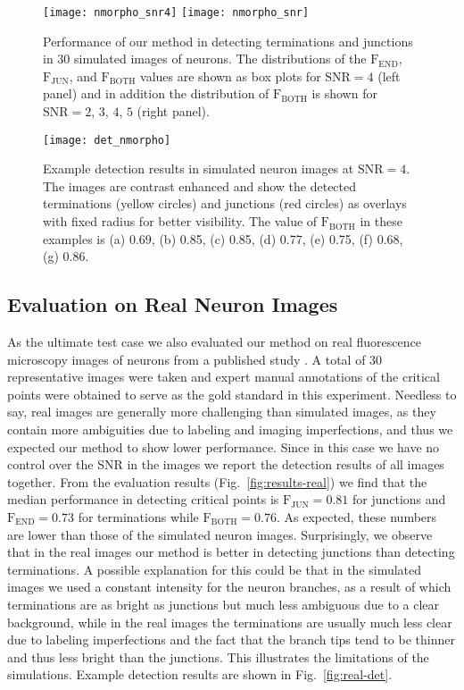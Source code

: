 \documentclass[twocolumn,natbib]{svjour3}
\begin{document}
\begin{figure}[!t]
\centering
\texttt{[image: nmorpho\_snr4]}\hfill
\texttt{[image: nmorpho\_snr]}
\caption{Performance of our method in detecting terminations and junctions in 30 simulated images of neurons. The distributions of the $\textrm{F}_\textrm{END}$, $\textrm{F}_\textrm{JUN}$, and $\textrm{F}_\textrm{BOTH}$ values are shown as box plots for $\textrm{SNR}=4$ (left panel) and in addition the distribution of $\textrm{F}_\textrm{BOTH}$ is shown for $\textrm{SNR}=2$, $3$, $4$, $5$ (right panel).}
\label{fig:results-sim}
\end{figure}

\begin{figure}[!t]
\centering
\texttt{[image: det\_nmorpho]}
\caption{Example detection results in simulated neuron images at $\textrm{SNR}=4$. The images are contrast enhanced and show the detected terminations (yellow circles) and junctions (red circles) as overlays with fixed radius for better visibility. The value of $\textrm{F}_\textrm{BOTH}$ in these examples is (a) 0.69, (b) 0.85, (c) 0.85, (d) 0.77, (e) 0.75, (f) 0.68, (g) 0.86.}
\label{fig:nmorpho-det}
\end{figure}

\subsection{Evaluation on Real Neuron Images}
\label{subsec:experiments-real}
As the ultimate test case we also evaluated our method on real fluorescence microscopy images of neurons from a published study \citep{steiner2002overexpression}. A total of 30 representative images were taken and expert manual annotations of the critical points were obtained to serve as the gold standard in this experiment. Needless to say, real images are generally more challenging than simulated images, as they contain more ambiguities due to labeling and imaging imperfections, and thus we expected our method to show lower performance. Since in this case we have no control over the SNR in the images we report the detection results of all images together. From the evaluation results (Fig.~\ref{fig:results-real}) we find that the median performance in detecting critical points is $\textrm{F}_{\textrm{JUN}}=0.81$ for junctions and $\textrm{F}_{\textrm{END}}=0.73$ for terminations while $\textrm{F}_{\textrm{BOTH}}=0.76$. As expected, these numbers are lower than those of the simulated neuron images. Surprisingly, we observe that in the real images our method is better in detecting junctions than detecting terminations. A possible explanation for this could be that in the simulated images we used a constant intensity for the neuron branches, as a result of which terminations are as bright as junctions but much less ambiguous due to a clear background, while in the real images the terminations are usually much less clear due to labeling imperfections and the fact that the branch tips tend to be thinner and thus less bright than the junctions. This illustrates the limitations of the simulations. Example detection results are shown in Fig.~\ref{fig:real-det}.
\end{document}
